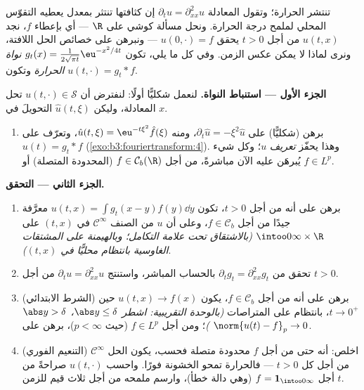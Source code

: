 \begin{problem}[{مسألة نهاية الأسبوع --- $\partial_tu =
\partial^2_{xx}u$، محلولةً من
أولها إلى آخرها}]
\label{pb:b3:fouriertransform:1}
تنتشر الحرارة؛ وتقول المعادلة $\partial_tu = \partial_{xx}^2u$ إن كثافتها تنتثر بمعدل
يعطيه التقوّس المحلي لملمح درجة الحرارة. ونحل مسألة كوشي على
$\R$ --- أي بإعطاء $f$، نجد $u(t, x)$ من أجل $t > 0$ يحقق
$u(0, \cdot) = f$ --- ونبرهن على خصائص الحل اللافتة، ونرى لماذا لا يمكن
عكس الزمن. وفي كل ما يلي، تكون $g_t(x) = \frac1{2\sqrt{\pi t}}\eu^{-x^2/4t}$ \emph{نواة
الحرارة} وتكون $u(t, \cdot) = g_t *
f$.

\medskip
\noindent\textbf{الجزء الأول --- استنباط النواة.} لنعمل شكليًّا
أولًا: لنفترض أن $u(t, \cdot) \in \mathcal S$ تحل المعادلة، وليكن $\hat u(t, \xi)$
التحويلَ في $x$.
\begin{enumerate}
  \item برهن (شكليًّا) على $\partial_t\hat u = -\xi^2\hat u$، ومنه $\hat u(t,\xi) = \eu^{-t\xi^2}\hat f(\xi)$، وتعرّف على
        $u(t) = g_t * f$ (\cref{exo:b3:fouriertransform:4}). وهذا يحفّز
        \emph{تعريف} $u$؛ وكل شيء يُبرهَن عليه الآن مباشرةً،
        من أجل $f \in \mathcal C_b(\R)$ (المحدودة المتصلة) أو $f \in L^p$.
\end{enumerate}

\medskip
\noindent\textbf{الجزء الثاني --- التحقق.}
\begin{enumerate}[resume]
  \item برهن على أنه من أجل $t > 0$، تكون $u(t, x) = \int
        g_t(x-y)f(y)\dd y$ معرَّفة
        جيدًا من أجل $f \in \mathcal
        C_b$، وعلى أن $u$ من الصنف $\mathcal C^\infty$ في
        $(t, x)$ على $\intoo0\infty\times\R$ \emph{(بالاشتقاق تحت علامة
        التكامل؛ وبالهيمنة على المشتقات الغاوسية بانتظام
        محليًّا في $(t,x)$)}.
  \item تحقق من $\partial_tg_t = \partial^2_{xx}g_t$ بالحساب المباشر، واستنتج $\partial_tu =
        \partial^2_{xx}u$ من
        أجل $t > 0$.
  \item (الشرط الابتدائي) برهن على أنه من أجل $f \in \mathcal
        C_b$، يكون
        $u(t, x) \to f(x)$ حين $t \to 0^+$، بانتظام على المتراصات
        \emph{(بالوحدة التقريبية: اشطر $\abs y
        \leq \delta$، $\abs y > \delta$)}؛ ومن
        أجل $f \in L^p$ (حيث $p < \infty$)، برهن على $\norm{u(t) - f}_p \to 0$.
  \item (التنعيم الفوري) اخلص: أنه حتى من أجل $f$ محدودة
        متصلة فحسب، يكون الحل $\mathcal C^\infty$ من أجل كل $t > 0$ ---
        فالحرارة تمحو الخشونة فورًا. واحسب $u(t, \cdot)$
        صراحةً من أجل $f =
        \mathbf 1_{\intoo0\infty}$ (وهي دالة خطأ)، وارسم ملمحه من
        أجل ثلاث قيم للزمن $t$.
\end{enumerate}


\end{problem}
